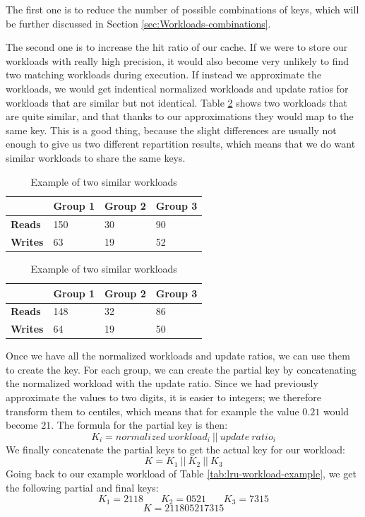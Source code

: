 The first one is to reduce the number of possible combinations of keys, which will be further discussed in Section \ref{sec:Workloads-combinations}.

The second one is to increase the hit ratio of our cache. If we were to store our workloads with really high precision, it would also become very unlikely to find two matching workloads during execution. If instead we approximate the workloads, we would get indentical normalized workloads and update ratios for workloads that are similar but not identical. Table \ref{tab:lru-similar-workload} shows two workloads that are quite similar, and that thanks to our approximations they would map to the same key. This is a good thing, because the slight differences are usually not enough to give us two different repartition results, which means that we do want similar workloads to share the same keys.

\begin{table}[!htb]
  \centering
  \begin{tabular}{l l l l}
    \hline
    & \textbf{Group 1} & \textbf{Group 2} & \textbf{Group 3} \\
    \hline
    \textbf{Reads} & 150 & 30 & 90 \\
    \textbf{Writes} & 63 & 19 & 52 \\
    \hline
  \end{tabular}

  \begin{tabular}{l l l l}
    \hline
    & \textbf{Group 1} & \textbf{Group 2} & \textbf{Group 3} \\
    \hline
    \textbf{Reads} & 148 & 32 & 86 \\
    \textbf{Writes} & 64 & 19 & 50 \\

  \end{tabular}
  \caption{Example of two similar workloads}\label{tab:lru-similar-workload}
\end{table}
Once we have all the normalized workloads and update ratios, we can use them to create the key. For each group, we can create the partial key by concatenating the normalized workload with the update ratio. Since we had previously approximate the values to two digits, it is easier to integers; we therefore transform them to centiles, which means that for example the value $0.21$ would become $21$. The formula for the partial key is then:
$$K_i = normalized\ workload_i\ ||\ update\ ratio_i $$
We finally concatenate the partial keys to get the actual key for our workload:
$$ K = K_1\ ||\ K_2\ ||\ K_3 $$
Going back to our example workload of Table \ref{tab:lru-workload-example}, we get the following partial and final keys:
$$ K_1 = 2118\ \ \ \ \ \ \ \ K_2 = 0521\ \ \ \ \ \ \ \ K_3 =7315 $$
$$ K = 211805217315 $$

